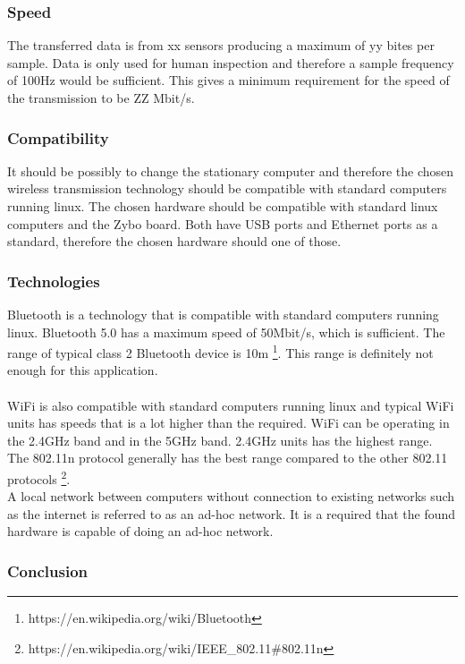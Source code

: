 \subsubsection{Speed}
The transferred data is from xx sensors producing a maximum of yy bites per sample. 
Data is only used for human inspection and therefore a sample frequency of 100Hz would be sufficient.
This gives a minimum requirement for the speed of the transmission to be ZZ Mbit/s. 

\subsubsection{Compatibility}
It should be possibly to change the stationary computer and therefore the chosen wireless transmission technology should be compatible with standard computers running linux.
The chosen hardware should be compatible with standard linux computers and the Zybo board. 
Both have USB ports and Ethernet ports as a standard, therefore the chosen hardware should one of those.

\subsubsection{Technologies}
Bluetooth is a technology that is compatible with standard computers running linux. 
Bluetooth 5.0 has a maximum speed of 50Mbit/s, which is sufficient.
The range of typical class 2 Bluetooth device is 10m \footnote{https://en.wikipedia.org/wiki/Bluetooth}.
This range is definitely not enough for this application.
\\
\\  
WiFi is also compatible with standard computers running linux and typical WiFi units has speeds that is a lot higher than the required. 
WiFi can be operating in the 2.4GHz band and in the 5GHz band. 
2.4GHz units has the highest range. 
The 802.11n protocol generally has the best range compared to the other 802.11 protocols \footnote{https://en.wikipedia.org/wiki/IEEE\_802.11\#802.11n}.
\\
A local network between computers without connection to existing networks such as the internet is referred to as an ad-hoc network. 
It is a required that the found hardware is capable of doing an ad-hoc network.

\subsubsection{Conclusion} 

